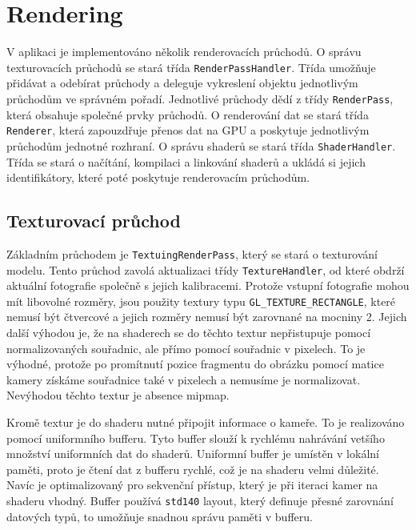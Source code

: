 \documentclass[11pt,twoside,a4paper]{book}
\begin{document}
\newpage
\section{Rendering}

V aplikaci je implementováno několik renderovacích průchodů. O správu texturovacích průchodů se stará třída \texttt{RenderPassHandler}. Třída umožňuje přidávat a odebírat průchody a deleguje vykreslení objektu jednotlivým průchodům ve správném pořadí. Jednotlivé průchody dědí z třídy \texttt{RenderPass}, která obsahuje společné prvky průchodů. O renderování dat se stará třída \texttt{Renderer}, která zapouzdřuje přenos dat na GPU a poskytuje jednotlivým průchodům jednotné rozhraní. O správu shaderů se stará třída \texttt{ShaderHandler}. Třída se stará o načítání, kompilaci a linkování shaderů a ukládá si jejich identifikátory, které poté poskytuje renderovacím průchodům.

\subsection{Texturovací průchod}

Základním průchodem je \texttt{TextuingRenderPass}, který se stará o texturování modelu. Tento průchod zavolá aktualizaci třídy \texttt{TextureHandler}, od které obdrží aktuální fotografie společně s jejich kalibracemi. Protože vstupní fotografie mohou mít libovolné rozměry, jsou použity textury typu \verb|GL_TEXTURE_RECTANGLE|, které nemusí být čtvercové a jejich rozměry nemusí být zarovnané na mocniny 2. Jejich další výhodou je, že na shaderech se do těchto textur nepřistupuje pomocí normalizovaných souřadnic, ale přímo pomocí souřadnic v pixelech. To je výhodné, protože po promítnutí pozice fragmentu do obrázku pomocí matice kamery získáme souřadnice také v pixelech a nemusíme je normalizovat. Nevýhodou těchto textur je absence mipmap.

Kromě textur je do shaderu nutné připojit informace o kameře. To je realizováno pomocí uniformního bufferu. Tyto buffer slouží k rychlému nahrávání vetšího množství uniformních dat do shaderů. Uniformní buffer je umístěn v lokální paměti, proto je čtení dat z bufferu rychlé, což je na shaderu velmi důležité. Navíc je optimalizovaný pro sekvenční přístup, který je při iteraci kamer na shaderu vhodný. Buffer používá \texttt{std140} layout, který definuje přesné zarovnání datových typů, to umožňuje snadnou správu paměti v bufferu.
\end{document}
